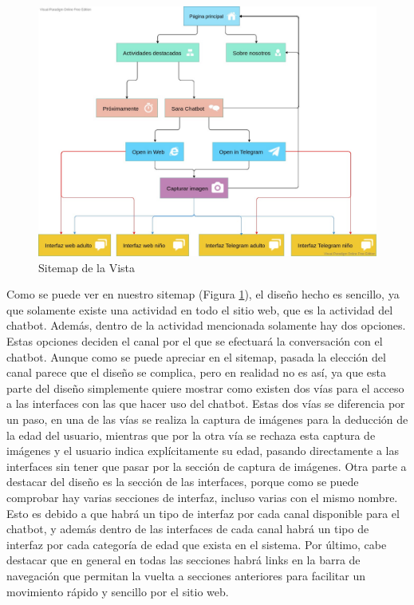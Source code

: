 \begin{figure}[h]
\centering
\includegraphics[width=1.1\textwidth]{imagenes/06_Diseno/Sitemap.jpg}
\caption{Sitemap de la Vista}
\label{fig:sitemap}
\end{figure}

Como se puede ver en nuestro sitemap (Figura \ref{fig:sitemap}), el diseño hecho es sencillo, ya que solamente existe una actividad en todo el sitio web, que es la actividad del chatbot. Además, dentro de la actividad mencionada solamente hay dos opciones. Estas opciones deciden el canal por el que se efectuará la conversación con el chatbot. Aunque como se puede apreciar en el sitemap, pasada la elección del canal parece que el diseño se complica, pero en realidad no es así, ya que esta parte del diseño simplemente quiere mostrar como existen dos vías para el acceso a las interfaces con las que hacer uso del chatbot. Estas dos vías se diferencia por un paso, en una de las vías se realiza la captura de imágenes para la deducción de la edad del usuario, mientras que por la otra vía se rechaza esta captura de imágenes y el usuario indica explícitamente su edad, pasando directamente a las interfaces sin tener que pasar por la sección de captura de imágenes. Otra parte a destacar del diseño es la sección de las interfaces, porque como se puede comprobar hay varias secciones de interfaz, incluso varias con el mismo nombre. Esto es debido a que habrá un tipo de interfaz por cada canal disponible para el chatbot, y además dentro de las interfaces de cada canal habrá un tipo de interfaz por cada categoría de edad que exista en el sistema. Por último, cabe destacar que en general en todas las secciones habrá links en la barra de navegación que permitan la vuelta a secciones anteriores para facilitar un movimiento rápido y sencillo por el sitio web.

